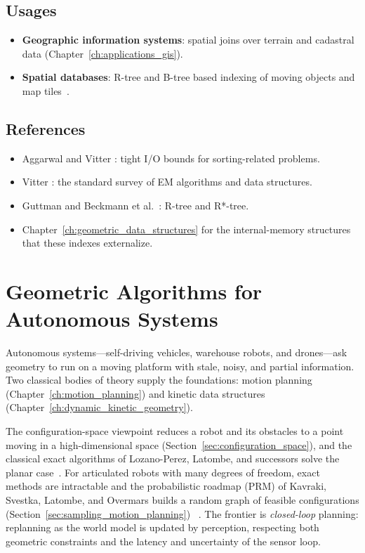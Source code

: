 \subsection{Usages}

\begin{itemize}
\item \textbf{Geographic information systems}: spatial joins over terrain and
  cadastral data (Chapter~\ref{ch:applications_gis}).
\item \textbf{Spatial databases}: R-tree and B-tree based indexing of moving
  objects and map tiles~\cite{guttman1984,beckmann1990}.
\end{itemize}

\subsection{References}

\begin{itemize}
\item Aggarwal and Vitter \cite{aggarwalvitter1988}: tight I/O bounds for
  sorting-related problems.
\item Vitter \cite{vitter2001}: the standard survey of EM algorithms and data
  structures.
\item Guttman \cite{guttman1984} and Beckmann et al.\ \cite{beckmann1990}:
  R-tree and R*-tree.
\item Chapter~\ref{ch:geometric_data_structures} for the internal-memory
  structures that these indexes externalize.
\end{itemize}

\section{Geometric Algorithms for Autonomous Systems}
\label{sec:frontiers_autonomous}

Autonomous systems---self-driving vehicles, warehouse robots, and drones---ask
geometry to run on a moving platform with stale, noisy, and partial
information. Two classical bodies of theory supply the foundations: motion
planning (Chapter~\ref{ch:motion_planning}) and kinetic data structures
(Chapter~\ref{ch:dynamic_kinetic_geometry}).

The configuration-space viewpoint reduces a robot and its obstacles to a point
moving in a high-dimensional space (Section~\ref{sec:configuration_space}), and
the classical exact algorithms of Lozano-Perez, Latombe, and successors solve
the planar case~\cite{lozanoperez1983,latombe1991}. For articulated robots with
many degrees of freedom, exact methods are intractable and the probabilistic
roadmap (PRM) of Kavraki, Svestka, Latombe, and Overmars builds a random graph
of feasible configurations (Section~\ref{sec:sampling_motion_planning})
~\cite{kavraki1996}. The frontier is \emph{closed-loop} planning: replanning as
the world model is updated by perception, respecting both geometric constraints
and the latency and uncertainty of the sensor loop.

